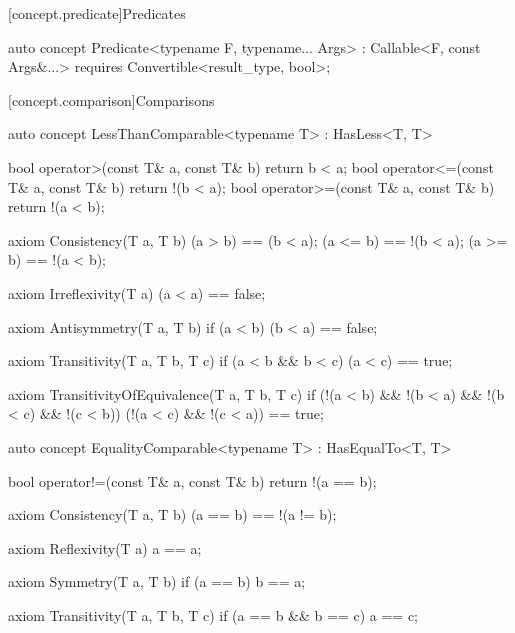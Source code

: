 \documentclass[american,twoside]{book}
\begin{document}
\begin{itemdescr}
\pnum
{}
\end{itemdescr}

[concept.predicate]{Predicates}

\begin{itemdecl}
auto concept Predicate<typename F, typename... Args> : Callable<F, const Args&...> {
  requires Convertible<result_type, bool>;
}
\end{itemdecl}

\begin{itemdescr}
\pnum
{}

\pnum
{}
\end{itemdescr}

[concept.comparison]{Comparisons}
\begin{itemdecl}
auto concept LessThanComparable<typename T> : HasLess<T, T> {
  bool operator>(const T& a, const T& b) { return b < a; }
  bool operator<=(const T& a, const T& b) { return !(b < a); }
  bool operator>=(const T& a, const T& b) { return !(a < b); }

  axiom Consistency(T a, T b) {
    (a > b) == (b < a);
    (a <= b) == !(b < a);
    (a >= b) == !(a < b);
  }

  axiom Irreflexivity(T a) { (a < a) == false; }

  axiom Antisymmetry(T a, T b) { 
    if (a < b) 
      (b < a) == false;
  }

  axiom Transitivity(T a, T b, T c) {
    if (a < b && b < c) 
      (a < c) == true;
  }

  axiom TransitivityOfEquivalence(T a, T b, T c) {
    if (!(a < b) && !(b < a) && !(b < c) && !(c < b))
      (!(a < c) && !(c < a)) == true;
  } 
}
\end{itemdecl}

\begin{itemdescr}
\pnum 
{}
\end{itemdescr}

\begin{itemdecl}
auto concept EqualityComparable<typename T> : HasEqualTo<T, T> {
  bool operator!=(const T& a, const T& b) { return !(a == b); }

  axiom Consistency(T a, T b) {
    (a == b) == !(a != b);
  }

  axiom Reflexivity(T a) { a == a; }

  axiom Symmetry(T a, T b) { 
    if (a == b) 
      b == a; 
  }

  axiom Transitivity(T a, T b, T c) {
    if (a == b && b == c) 
      a == c;
  }
}
\end{itemdecl}
\end{document}
